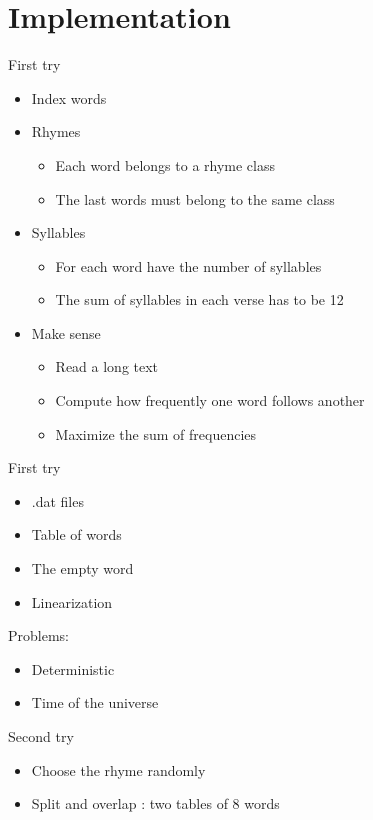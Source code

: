 \documentclass[unknownkeysallowed]{beamer}
\begin{document}
\section{Implementation}


\begin{frame}[fragile]{First try}
\begin{itemize}
\item Index words
\item Rhymes
\begin{itemize}
\item Each word belongs to a rhyme class
\item The last words must belong to the same class
\end{itemize}
\item Syllables
\begin{itemize}
\item For each word have the number of syllables
\item The sum of syllables in each verse has to be 12
\end{itemize}
\item Make sense
\begin{itemize}
\item Read a long text
\item Compute how frequently one word follows another
\item Maximize the sum of frequencies 
\end{itemize}
\end{itemize}
\end{frame}

\begin{frame}[fragile]{First try}
\begin{itemize}
\item .dat files
\item Table of words
\item The empty word
\item Linearization
\end{itemize}

Problems: 

\begin{itemize}
\item<2-> Deterministic
\item<2-> Time of the universe
\end{itemize}
\end{frame}

\begin{frame}[fragile]{Second try}
\begin{itemize}
\item Choose the rhyme randomly
\medskip
\item Split and overlap : two tables of 8 words
\end{itemize}
\end{frame}
\end{document}
